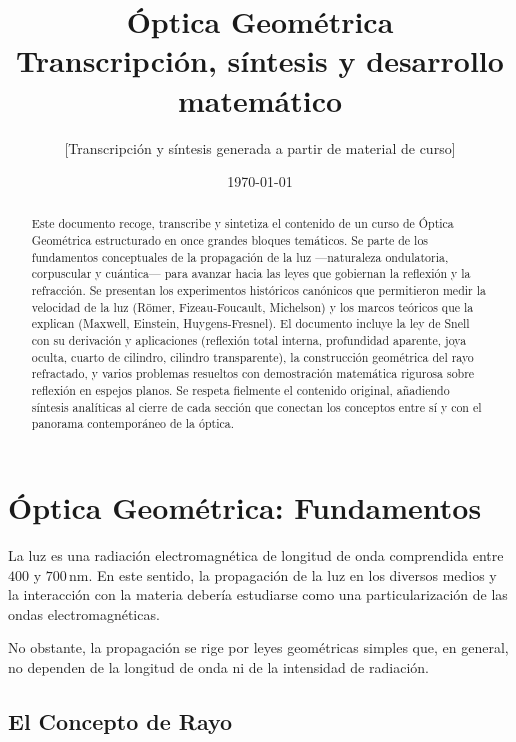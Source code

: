 \documentclass[12pt, a4paper]{article}
\title{\textbf{Óptica Geométrica}\\[0.5em]
\large Transcripción, síntesis y desarrollo matemático}
\author{[Transcripción y síntesis generada a partir de material de curso]}
\date{\today}
\theoremstyle{definition}
\begin{document}
\maketitle

\begin{abstract}
Este documento recoge, transcribe y sintetiza el contenido de un curso de Óptica Geométrica
estructurado en once grandes bloques temáticos. Se parte de los fundamentos conceptuales de la
propagación de la luz —naturaleza ondulatoria, corpuscular y cuántica— para avanzar hacia las
leyes que gobiernan la reflexión y la refracción. Se presentan los experimentos históricos
canónicos que permitieron medir la velocidad de la luz (Römer, Fizeau-Foucault, Michelson) y
los marcos teóricos que la explican (Maxwell, Einstein, Huygens-Fresnel). El documento incluye
la ley de Snell con su derivación y aplicaciones (reflexión total interna, profundidad aparente,
joya oculta, cuarto de cilindro, cilindro transparente), la construcción geométrica del rayo
refractado, y varios problemas resueltos con demostración matemática rigurosa sobre reflexión
en espejos planos. Se respeta fielmente el contenido original, añadiendo síntesis analíticas
al cierre de cada sección que conectan los conceptos entre sí y con el panorama contemporáneo
de la óptica.
\end{abstract}

\tableofcontents
\newpage

\section{Óptica Geométrica: Fundamentos}
\label{sec:optica_geometrica}

La luz es una radiación electromagnética de longitud de onda comprendida entre \(400\) y
\(700\,\text{nm}\). En este sentido, la propagación de la luz en los diversos medios y la
interacción con la materia debería estudiarse como una particularización de las ondas
electromagnéticas.

No obstante, la propagación se rige por leyes geométricas simples que, en general, no dependen
de la longitud de onda ni de la intensidad de radiación.

\subsection{El Concepto de Rayo}
\end{document}
